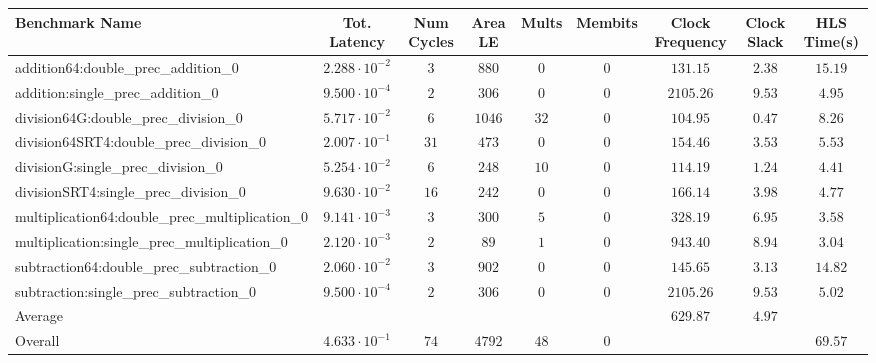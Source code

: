\begin{tabular}{|l|c|c|c|c|c|c|c|c|}
\hline
Benchmark Name                                   & Tot. Latency            & Num Cycles & Area LE  & Mults  & Membits & Clock Frequency & Clock Slack & HLS Time(s) \\
\hline
addition64:double\_prec\_addition\_0             & $ 2.288 \cdot 10^{-2} $ & $ 3      $ & $ 880  $ & $ 0  $ & $ 0   $ & $ 131.15      $ & $ 2.38    $ & $ 15.19   $ \\
addition:single\_prec\_addition\_0               & $ 9.500 \cdot 10^{-4} $ & $ 2      $ & $ 306  $ & $ 0  $ & $ 0   $ & $ 2105.26     $ & $ 9.53    $ & $ 4.95    $ \\
division64G:double\_prec\_division\_0            & $ 5.717 \cdot 10^{-2} $ & $ 6      $ & $ 1046 $ & $ 32 $ & $ 0   $ & $ 104.95      $ & $ 0.47    $ & $ 8.26    $ \\
division64SRT4:double\_prec\_division\_0         & $ 2.007 \cdot 10^{-1} $ & $ 31     $ & $ 473  $ & $ 0  $ & $ 0   $ & $ 154.46      $ & $ 3.53    $ & $ 5.53    $ \\
divisionG:single\_prec\_division\_0              & $ 5.254 \cdot 10^{-2} $ & $ 6      $ & $ 248  $ & $ 10 $ & $ 0   $ & $ 114.19      $ & $ 1.24    $ & $ 4.41    $ \\
divisionSRT4:single\_prec\_division\_0           & $ 9.630 \cdot 10^{-2} $ & $ 16     $ & $ 242  $ & $ 0  $ & $ 0   $ & $ 166.14      $ & $ 3.98    $ & $ 4.77    $ \\
multiplication64:double\_prec\_multiplication\_0 & $ 9.141 \cdot 10^{-3} $ & $ 3      $ & $ 300  $ & $ 5  $ & $ 0   $ & $ 328.19      $ & $ 6.95    $ & $ 3.58    $ \\
multiplication:single\_prec\_multiplication\_0   & $ 2.120 \cdot 10^{-3} $ & $ 2      $ & $ 89   $ & $ 1  $ & $ 0   $ & $ 943.40      $ & $ 8.94    $ & $ 3.04    $ \\
subtraction64:double\_prec\_subtraction\_0       & $ 2.060 \cdot 10^{-2} $ & $ 3      $ & $ 902  $ & $ 0  $ & $ 0   $ & $ 145.65      $ & $ 3.13    $ & $ 14.82   $ \\
subtraction:single\_prec\_subtraction\_0         & $ 9.500 \cdot 10^{-4} $ & $ 2      $ & $ 306  $ & $ 0  $ & $ 0   $ & $ 2105.26     $ & $ 9.53    $ & $ 5.02    $ \\
\hline
Average                                          & $                     $ & $        $ & $      $ & $    $ & $     $ & $ 629.87      $ & $ 4.97    $ & $         $ \\
\hline
Overall                                          & $ 4.633 \cdot 10^{-1} $ & $ 74     $ & $ 4792 $ & $ 48 $ & $ 0   $ & $             $ & $         $ & $ 69.57   $ \\
\hline
\end{tabular}
